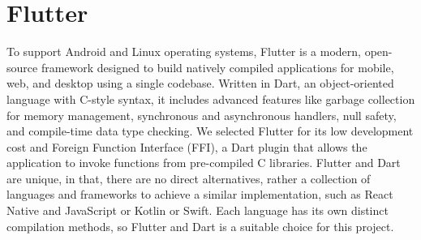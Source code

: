 \section{Flutter}

To support Android and Linux operating systems, Flutter is a modern, open-source framework designed to build natively compiled applications for mobile, web, and desktop using a single codebase. Written in Dart, an object-oriented language with C-style syntax, it includes advanced features like garbage collection for memory management, synchronous and asynchronous handlers, null safety, and compile-time data type checking. We selected Flutter for its low development cost and Foreign Function Interface (FFI), a Dart plugin that allows the application to invoke functions from pre-compiled C libraries. Flutter and Dart are unique, in that, there are no direct alternatives, rather a collection of languages and frameworks to achieve a similar implementation, such as React Native and JavaScript or Kotlin or Swift. Each language has its own distinct compilation methods, so Flutter and Dart is a suitable choice for this project.
